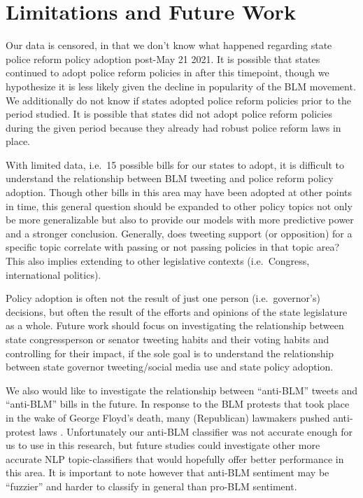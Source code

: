 \documentclass[12pt]{article}
\begin{document}
\hypertarget{limitations-and-future-work}{%
\section{Limitations and Future
Work}\label{limitations-and-future-work}}

Our data is censored, in that we don't know what happened regarding
state police reform policy adoption post-May 21 2021. It is possible
that states continued to adopt police reform policies in after this
timepoint, though we hypothesize it is less likely given the decline in
popularity of the BLM movement. We additionally do not know if states
adopted police reform policies prior to the period studied. It is
possible that states did not adopt police reform policies during the
given period because they already had robust police reform laws in
place.

With limited data, i.e.~15 possible bills for our states to adopt, it is
difficult to understand the relationship between BLM tweeting and police
reform policy adoption. Though other bills in this area may have been
adopted at other points in time, this general question should be
expanded to other policy topics not only be more generalizable but also
to provide our models with more predictive power and a stronger
conclusion. Generally, does tweeting support (or opposition) for a
specific topic correlate with passing or not passing policies in that
topic area? This also implies extending to other legislative contexts
(i.e.~Congress, international politics).

Policy adoption is often not the result of just one person
(i.e.~governor's) decisions, but often the result of the efforts and
opinions of the state legislature as a whole. Future work should focus
on investigating the relationship between state congressperson or
senator tweeting habits and their voting habits and controlling for
their impact, if the sole goal is to understand the relationship between
state governor tweeting/social media use and state policy adoption.

We also would like to investigate the relationship between ``anti-BLM''
tweets and ``anti-BLM'' bills in the future. In response to the BLM
protests that took place in the wake of George Floyd's death, many
(Republican) lawmakers pushed anti-protest laws \citep{Gabbatt}.
Unfortunately our anti-BLM classifier was not accurate enough for us to
use in this research, but future studies could investigate other more
accurate NLP topic-classifiers that would hopefully offer better
performance in this area. It is important to note however that anti-BLM
sentiment may be ``fuzzier'' and harder to classify in general than
pro-BLM sentiment.
\end{document}
